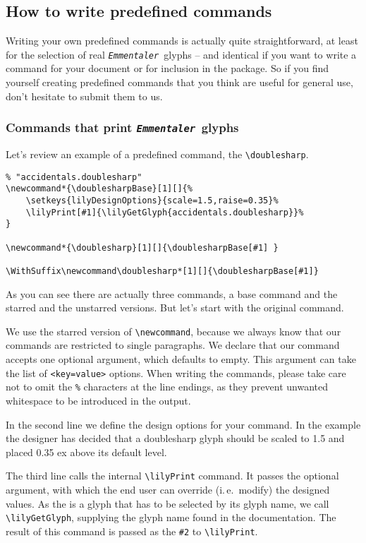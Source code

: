 \documentclass{article}
\newcommand*{\emmentaler}{\texttt{\textit{Emmentaler }}}
\newcommand*{\cmd}[1]{\texttt{\textbackslash #1}}
\begin{document}
\subsection{How to write predefined commands}
Writing your own predefined commands is actually quite straightforward, at least for the selection of real \emmentaler glyphs -- and identical if you want to write a command for your document or for inclusion in the package.
So if you find yourself creating predefined commands that you think are useful for general use, don't hesitate to submit them to us. 

\subsubsection{Commands that print \emmentaler glyphs}
Let's review an example of a predefined command, the \cmd{doublesharp}.

\begin{verbatim}
% "accidentals.doublesharp"
\newcommand*{\doublesharpBase}[1][]{%
	\setkeys{lilyDesignOptions}{scale=1.5,raise=0.35}%
	\lilyPrint[#1]{\lilyGetGlyph{accidentals.doublesharp}}%
}

\newcommand*{\doublesharp}[1][]{\doublesharpBase[#1] }

\WithSuffix\newcommand\doublesharp*[1][]{\doublesharpBase[#1]}
\end{verbatim}
As you can see there are actually three commands, a base command and the starred and the unstarred versions.
But let's start with the original command.

We use the starred version of \cmd{newcommand}, because we always know that our commands are restricted to single paragraphs.
We declare that our command accepts one optional argument, which defaults to empty. 
This argument can take the list of \texttt{<key=value>} options.
When writing the commands, please take care not to omit the \texttt{\%} characters at the line endings, as they prevent unwanted whitespace to be introduced in the output.

In the second line we define the design options for your command.
In the example the designer has decided that a doublesharp glyph should be scaled to 1.5 and placed 0.35 ex above its default level.

The third line calls the internal \cmd{lilyPrint} command. 
It passes the optional argument, with which the end user can override (i.\,e.\ modify) the designed values.
As the \doublesharp is a glyph that has to be selected by its glyph name, we call \cmd{lilyGetGlyph}, supplying the glyph name found in the documentation.
The result of this command is passed as the \texttt{\#2} to \cmd{lilyPrint}.
\end{document}
